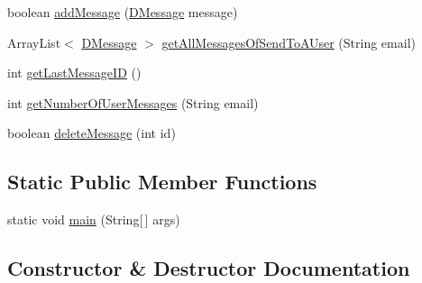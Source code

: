 \begin{DoxyCompactItemize}
\item 
boolean \mbox{\hyperlink{classes_1_1deusto_1_1bspq18_1_1e6_1_1_deusto_box_1_1_server_1_1jdo_1_1dao_1_1_deusto_box_d_a_o_a54afa270fb0e6e8bc7725c52b080649d}{add\+Message}} (\mbox{\hyperlink{classes_1_1deusto_1_1bspq18_1_1e6_1_1_deusto_box_1_1_server_1_1jdo_1_1data_1_1_d_message}{D\+Message}} message)
\item 
Array\+List$<$ \mbox{\hyperlink{classes_1_1deusto_1_1bspq18_1_1e6_1_1_deusto_box_1_1_server_1_1jdo_1_1data_1_1_d_message}{D\+Message}} $>$ \mbox{\hyperlink{classes_1_1deusto_1_1bspq18_1_1e6_1_1_deusto_box_1_1_server_1_1jdo_1_1dao_1_1_deusto_box_d_a_o_a5357c3fa65d1cb8e48114eee52358a9b}{get\+All\+Messages\+Of\+Send\+To\+A\+User}} (String email)
\item 
int \mbox{\hyperlink{classes_1_1deusto_1_1bspq18_1_1e6_1_1_deusto_box_1_1_server_1_1jdo_1_1dao_1_1_deusto_box_d_a_o_acfc34cbf454de0b8ef1bc83ef8c41562}{get\+Last\+Message\+ID}} ()
\item 
int \mbox{\hyperlink{classes_1_1deusto_1_1bspq18_1_1e6_1_1_deusto_box_1_1_server_1_1jdo_1_1dao_1_1_deusto_box_d_a_o_a31147274fcf6c6d1f5d63d2b42c43708}{get\+Number\+Of\+User\+Messages}} (String email)
\item 
boolean \mbox{\hyperlink{classes_1_1deusto_1_1bspq18_1_1e6_1_1_deusto_box_1_1_server_1_1jdo_1_1dao_1_1_deusto_box_d_a_o_a4e42b41382683d87b32810a60080c8d0}{delete\+Message}} (int id)
\end{DoxyCompactItemize}
\subsection*{Static Public Member Functions}
\begin{DoxyCompactItemize}
\item 
static void \mbox{\hyperlink{classes_1_1deusto_1_1bspq18_1_1e6_1_1_deusto_box_1_1_server_1_1jdo_1_1dao_1_1_deusto_box_d_a_o_a82e1c51807d07103a2393ca03506adfd}{main}} (String\mbox{[}$\,$\mbox{]} args)
\end{DoxyCompactItemize}


\subsection{Constructor \& Destructor Documentation}
\mbox{\label{classes_1_1deusto_1_1bspq18_1_1e6_1_1_deusto_box_1_1_server_1_1jdo_1_1dao_1_1_deusto_box_d_a_o_aa34df1a85684509c3bad297ab022128e}} 
